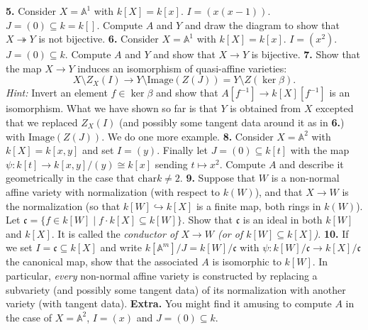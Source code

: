 \documentclass[11pt]{amsart}
\theoremstyle{theorem}
\renewcommand{\to}[1][]{\xrightarrow{\ #1\ }}
\newcommand{\bA}{\mathbb{A}}
\begin{document}
\newpage
\noindent
{\bf 5.}  Consider $X = \bA^1$ with $k[X] = k[x]$.  $I = (x(x-1))$.  $J = (0) \subseteq k = k[]$.  Compute $A$ and $Y$ and draw the diagram to show that $X \twoheadrightarrow Y$ is not bijective.
\vskip 130pt
\noindent
{\bf 6.}  Consider $X = \bA^1$ with $k[X] = k[x]$.  $I = (x^2)$.  $J = (0) \subseteq k$.  Compute $A$ and $Y$ and show that $X \to Y$ is bijective.
\vskip 130pt
\noindent
{\bf 7.}  Show that the map $X \to Y$ induces an isomorphism of quasi-affine varieties:
\[
X \setminus Z_X(I) \to Y \setminus \mathrm{Image}(Z(J)) = Y \setminus Z(\ker \beta).
\]
\emph{Hint:} Invert an element $f \in \ker \beta$ and show that $A[f^{-1}] \to k[X][f^{-1}]$ is an isomorphism.
\vskip 180pt
What we have shown so far is that $Y$ is obtained from $X$ excepted that we replaced $Z_X(I)$ (and possibly some tangent data around it as in {\bf 6.}) with $\mathrm{Image}(Z(J))$.  We do one more example.
\vskip 9pt
\noindent
{\bf 8.}  Consider $X = \bA^2$ with $k[X] = k[x,y]$ and set $I = (y)$.  Finally let $J = (0) \subseteq k[t]$ with the map $\psi : k[t] \to k[x,y]/(y) \cong k[x]$ sending $t \mapsto x^2$.  Compute $A$ and describe it geometrically in the case that $\mathrm{char} k \neq 2$.
\newpage
\noindent
{\bf 9.}  Suppose that $W$ is a non-normal affine variety with normalization (with respect to $k(W)$), and that $X \to W$ is the normalization (so that $k[W] \hookrightarrow k[X]$ is a finite map, both rings in $k(W)$).  Let $\mathfrak{c} = \{f \in k[W] \;|\; f \cdot k[X] \subseteq k[W] \}$.  Show that $\mathfrak{c}$ is an ideal in both $k[W]$ and $k[X]$.  It is called the \emph{conductor of $X \to W$ (or of $k[W] \subseteq k[X]$)}.
\vskip 200pt
\noindent
{\bf 10.}  If we set $I = \mathfrak{c} \subseteq k[X]$ and write $k[\bA^m]/J = k[W]/\mathfrak{c}$ with $\psi : k[W]/\mathfrak{c} \to k[X]/\mathfrak{c}$ the canonical map, show that the associated $A$ is isomorphic to $k[W]$.  In particular, \emph{every} non-normal affine variety is constructed by replacing a subvariety (and possibly some tangent data) of its normalization with another variety (with tangent data).
\vfill
\noindent
{\bf Extra.}  You might find it amusing to compute $A$ in the case of $X = \bA^2$, $I = (x)$ and $J = (0) \subseteq k$.
\end{document}
